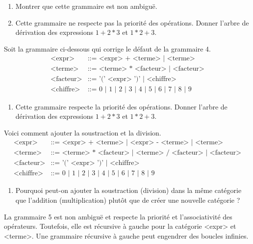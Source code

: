 \begin{Exercise}[title={Grammaire pour l'addition et la multiplication}]
\begin{enumerate}
\item Montrer que cette grammaire est non ambiguë.
\item Cette grammaire ne respecte pas la priorité des
  opérations. Donner l'arbre de dérivation des expressions
  $1 + 2 * 3$ et $1 * 2 + 3$.
\end{enumerate}
\vspace{-\bigskipamount}

\ExePart[title={Grammaire 5}]
Soit la grammaire ci-dessous qui corrige le défaut de la grammaire 4. 
\begin{align*}
  \text{<expr>}  &\text{::=  <expr> + <terme> |  <terme>} \\
  \text{<terme>} &\text{::=  <terme> * <facteur> | <facteur>} \\
  \text{<facteur>} &\text{::= '(' <expr> ')' | <chiffre>} \\
  \text{<chiffre>}  &\text{::=  0 | 1 | 2 | 3 | 4 | 5 | 6 | 7 | 8 | 9 }
\end{align*}

\begin{enumerate}
\item Cette grammaire respecte la priorité des opérations. Donner
  l'arbre de dérivation des expressions $1 + 2 * 3$ et $1 * 2 + 3$.
\end{enumerate}
\vspace{-\bigskipamount}

\ExePart[title={Grammaire 6}]
Voici comment ajouter la soustraction et la division. 
\begin{align*}
  \text{<expr>}  &\text{::=  <expr> + <terme> | <expr> - <terme> |  <terme>} \\
  \text{<terme>} &\text{::=  <terme> * <facteur> |  <terme> / <facteur> | <facteur>} \\
  \text{<facteur>} &\text{::= '(' <expr> ')' | <chiffre>} \\
  \text{<chiffre>}  &\text{::=  0 | 1 | 2 | 3 | 4 | 5 | 6 | 7 | 8 | 9 }
\end{align*}

\begin{enumerate}
\item Pourquoi peut-on ajouter la soustraction (division) dans la même
  catégorie que l'addition (multiplication) plutôt que de créer une
  nouvelle catégorie ?
\end{enumerate}
\vspace{-\bigskipamount}

\ExePart[title={Grammaire 7 - Pour les curieux}]
La grammaire 5 est non ambiguë et respecte la priorité et
l'associativité des opérateurs. Toutefois, elle est récursive à gauche
pour la catégorie <expr> et <terme>. Une grammaire récursive à gauche peut
engendrer des boucles infinies. 


\end{Exercise}
